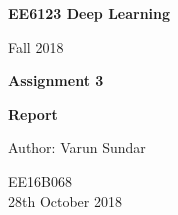\begin{titlepage}
    \begin{center}
        \vspace*{1cm}
        
        \Huge
          \textbf{EE6123 Deep Learning}
        
        \vspace{0.5cm}
        \LARGE
        Fall 2018
        
        \vspace{1.5cm}
        
        \textbf{Assignment 3}
   		  \vspace{1.5cm}
        
        \textbf{Report}
       
        \vfill
        
        Author: Varun Sundar
        
        \vspace{0.8cm}
          \Large
        EE16B068 \\
        \vspace{0.5cm}
       28th October 2018
        
    \end{center}
\end{titlepage}